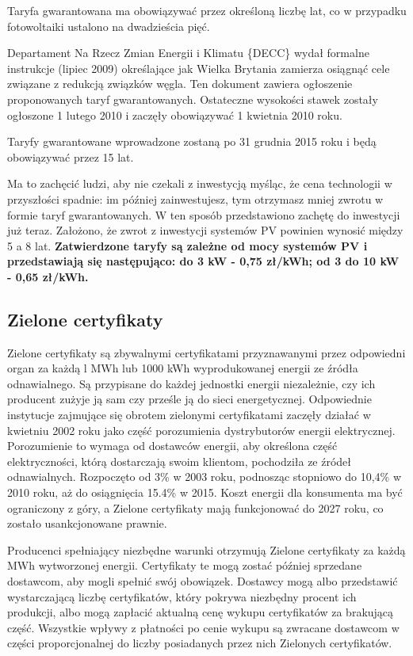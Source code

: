 \documentclass[12pt,a4paper]{article}
\begin{document}
Taryfa gwarantowana ma obowiązywać przez określoną liczbę lat, co w 
przypadku fotowoltaiki ustalono na dwadzieścia pięć.

Departament Na Rzecz Zmian Energii i Klimatu \{DECC\} wydał formalne 
instrukcje (lipiec 2009) określające jak Wielka Brytania zamierza 
osiągnąć cele związane z redukcją związków węgla. Ten dokument zawiera 
ogłoszenie proponowanych taryf gwarantowanych. Ostateczne wysokości 
stawek zostały ogłoszone 1 lutego 2010 i zaczęły obowiązywać 1 kwietnia 
2010 roku.

Taryfy gwarantowane wprowadzone zostaną po 31 grudnia 2015 roku i będą 
obowiązywać przez 15 lat. 

Ma to zachęcić ludzi, aby nie czekali z inwestycją myśląc, że cena 
technologii w przyszłości spadnie: im później zainwestujesz, tym 
otrzymasz mniej zwrotu w formie taryf gwarantowanych. W ten sposób 
przedstawiono zachętę do inwestycji już teraz. Założono, że zwrot z 
inwestycji systemów PV powinien wynosić między 5 a 8 lat. \textbf{Zatwierdzone 
taryfy są zależne od mocy systemów PV i przedstawiają się następująco: 
do 3 kW - 0,75 zł/kWh; od 3 do 10 kW - 0,65 zł/kWh. }

\subsection{Zielone certyfikaty}

Zielone certyfikaty są zbywalnymi certyfikatami przyznawanymi przez 
odpowiedni organ za każdą l MWh lub 1000 kWh wyprodukowanej energii ze 
źródła odnawialnego. Są przypisane do każdej jednostki energii 
niezależnie, czy ich producent zużyje ją sam czy prześle ją do sieci 
energetycznej. Odpowiednie instytucje zajmujące się obrotem zielonymi 
certyfikatami zaczęły działać w kwietniu 2002 roku jako część 
porozumienia dystrybutorów energii elektrycznej. Porozumienie to wymaga 
od dostawców energii, aby określona część elektryczności, którą 
dostarczają swoim klientom, pochodziła ze źródeł odnawialnych. 
Rozpoczęto od 3\% w 2003 roku, podnosząc stopniowo do 10,4\% w 2010 
roku, aż do osiągnięcia 15.4\% w 2015. Koszt energii dla konsumenta ma 
być ograniczony z góry, a Zielone certyfikaty mają funkcjonować do 2027 
roku, co zostało usankcjonowane prawnie. 

Producenci spełniający niezbędne warunki otrzymują Zielone certyfikaty 
za każdą MWh wytworzonej energii. Certyfikaty te mogą zostać później 
sprzedane dostawcom, aby mogli spełnić swój obowiązek. Dostawcy mogą 
albo przedstawić wystarczającą liczbę certyfikatów, który pokrywa 
niezbędny procent ich produkcji, albo mogą zapłacić aktualną cenę wykupu 
certyfikatów za brakującą część. Wszystkie wpływy z płatności po cenie 
wykupu są zwracane dostawcom w części proporcjonalnej do liczby 
posiadanych przez nich Zielonych certyfikatów. 
\end{document}
